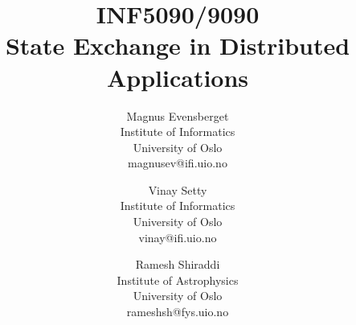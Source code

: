 \documentclass[12pt, conference, compsocconf, letterpaper]{IEEEtran}
\begin{document}
\title{INF5090/9090\\State Exchange in Distributed Applications}

%
%
%
%
%

%
\author{
	Magnus Evensberget\\
	Institute of Informatics\\
	University of Oslo\\
	magnusev@ifi.uio.no
\and
	Vinay Setty\\
	Institute of Informatics\\
	University of Oslo\\
	vinay@ifi.uio.no
\and
	Ramesh Shiraddi\\
	Institute of Astrophysics\\
	University of Oslo\\
	rameshsh@fys.uio.no
}
\end{document}
